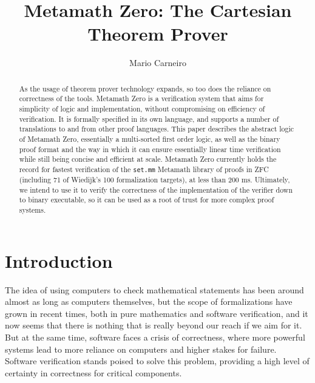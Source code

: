 \documentclass[runningheads]{llncs}
\begin{document}
%
\title{Metamath Zero: The Cartesian Theorem Prover}
%
\author{Mario Carneiro}
%
\maketitle              %
%
\begin{abstract}
As the usage of theorem prover technology expands, so too does the reliance on correctness of the tools. Metamath Zero is a verification system that aims for simplicity of logic and implementation, without compromising on efficiency of verification. It is formally specified in its own language, and supports a number of translations to and from other proof languages. This paper describes the abstract logic of Metamath Zero, essentially a multi-sorted first order logic, as well as the binary proof format and the way in which it can ensure essentially linear time verification while still being concise and efficient at scale. Metamath Zero currently holds the record for fastest verification of the \texttt{set.mm} Metamath library of proofs in ZFC (including 71 of Wiedijk's 100 formalization targets), at less than 200 ms. Ultimately, we intend to use it to verify the correctness of the implementation of the verifier down to binary executable, so it can be used as a root of trust for more complex proof systems.

\end{abstract}
%
%
%
\section{Introduction}\label{sec:intro}

The idea of using computers to check mathematical statements has been around almost as long as computers themselves, but the scope of formalizations have grown in recent times, both in pure mathematics and software verification, and it now seems that there is nothing that is really beyond our reach if we aim for it. But at the same time, software faces a crisis of correctness, where more powerful systems lead to more reliance on computers and higher stakes for failure. Software verification stands poised to solve this problem, providing a high level of certainty in correctness for critical components.
\end{document}
